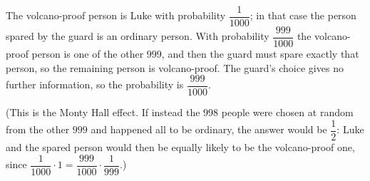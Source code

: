 The volcano-proof person is Luke with probability $\dfrac{1}{1000}$; in that case the person spared by the guard is an ordinary person. With probability $\dfrac{999}{1000}$ the volcano-proof person is one of the other $999$, and then the guard must spare exactly that person, so the remaining person is volcano-proof. The guard's choice gives no further information, so the probability is $\boxed{\dfrac{999}{1000}}$.

(This is the Monty Hall effect. If instead the $998$ people were chosen at random from the other $999$ and happened all to be ordinary, the answer would be $\dfrac{1}{2}$: Luke and the spared person would then be equally likely to be the volcano-proof one, since $\dfrac{1}{1000}\cdot1=\dfrac{999}{1000}\cdot\dfrac{1}{999}$.)
